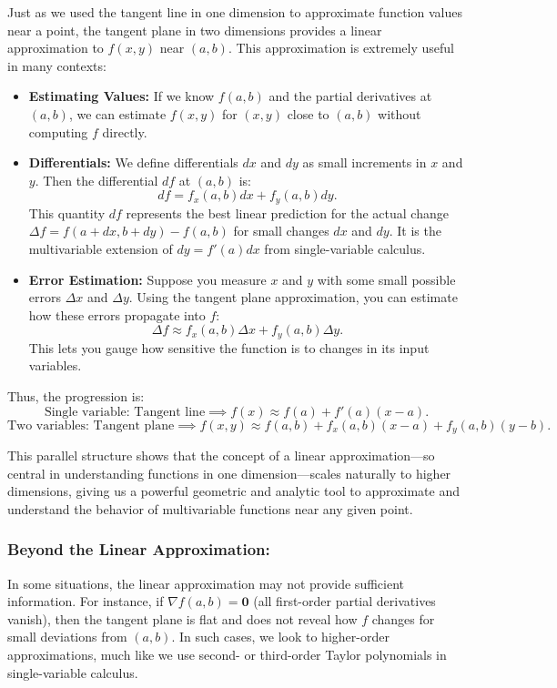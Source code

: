 \noindent Just as we used the tangent line in one dimension to approximate function values near a point, the tangent plane in two dimensions provides a linear approximation to \( f(x,y) \) near \((a,b)\). This approximation is extremely useful in many contexts:
\begin{itemize}
    \item \textbf{Estimating Values:} If we know \( f(a,b) \) and the partial derivatives at \((a,b)\), we can estimate \( f(x,y) \) for \((x,y)\) close to \((a,b)\) without computing \( f \) directly.
    \item \textbf{Differentials:} We define differentials \( dx \) and \( dy \) as small increments in \( x \) and \( y \). Then the differential \( df \) at \((a,b)\) is:
    \[
    df = f_x(a,b) dx + f_y(a,b) dy.
    \]
    This quantity \( df \) represents the best linear prediction for the actual change \(\Delta f = f(a+dx,b+dy)-f(a,b)\) for small changes \( dx \) and \( dy \). It is the multivariable extension of \( dy = f'(a)dx \) from single-variable calculus.
    \item \textbf{Error Estimation:} Suppose you measure \( x \) and \( y \) with some small possible errors \(\Delta x\) and \(\Delta y\). Using the tangent plane approximation, you can estimate how these errors propagate into \( f \):
    \[
    \Delta f \approx f_x(a,b)\Delta x + f_y(a,b)\Delta y.
    \]
    This lets you gauge how sensitive the function is to changes in its input variables.
\end{itemize}

\noindent Thus, the progression is:
\[
\text{Single variable: Tangent line} \implies f(x) \approx f(a) + f'(a)(x-a).
\]
\[
\text{Two variables: Tangent plane} \implies f(x,y) \approx f(a,b) + f_x(a,b)(x-a) + f_y(a,b)(y-b).
\]

\noindent This parallel structure shows that the concept of a linear approximation—so central in understanding functions in one dimension—scales naturally to higher dimensions, giving us a powerful geometric and analytic tool to approximate and understand the behavior of multivariable functions near any given point.

\subsubsection*{Beyond the Linear Approximation:} 

In some situations, the linear approximation may not provide sufficient information. For instance, if \(\nabla f(a,b) = \mathbf{0}\) (all first-order partial derivatives vanish), then the tangent plane is flat and does not reveal how \( f \) changes for small deviations from \((a,b)\). In such cases, we look to higher-order approximations, much like we use second- or third-order Taylor polynomials in single-variable calculus. \\

